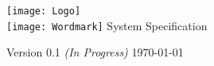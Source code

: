 \begin{titlepage}
  \begin{center}
    \texttt{[image: Logo]} \\
    \vfill
    \texttt{[image: Wordmark]}
    \vfill
    \vfill
    \LARGE
    System Specification
  \end{center}

  \vfill
  \vfill


  \vspace{1em}

  \large
  Version 0.1 \textit{(In Progress)} \newline
  \today
  \normalsize
\end{titlepage}
\restoregeometry